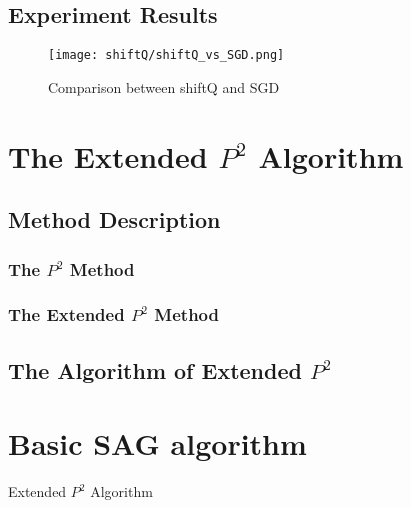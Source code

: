 \subsection{Experiment Results}

\begin{figure*}[h!]
	\texttt{[image: shiftQ/shiftQ\_vs\_SGD.png]}
	\caption{Comparison between shiftQ and SGD}
\end{figure*}

\section{The Extended $P^2$ Algorithm}
\label{sec: multi_{p2}}

\subsection{Method Description}

\subsubsection{The $P^2$ Method}
\subsubsection{The Extended $P^2$ Method}

\subsection{The Algorithm of Extended $P^2$}

\section{Basic SAG algorithm}

\begin{algorithm}
    \caption{Extended $P^2$ Algorithm}\label{alg:multi_ext_p2}
        \begin{algorithmic}[1]
        \end{algorithmic}
\end{algorithm}

